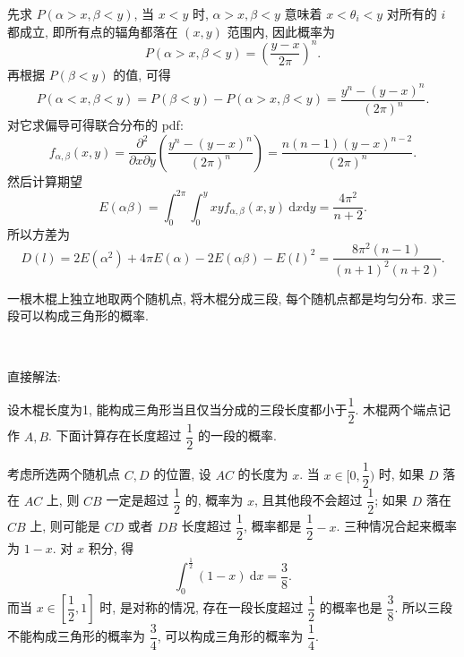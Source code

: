 先求 $P(\alpha > x, \beta < y)$, 当 $x < y$ 时, $\alpha > x, \beta < y$ 意味着 $x < \theta_i < y$ 对所有的 $i$ 都成立, 即所有点的辐角都落在 $(x,y)$ 范围内, 因此概率为 
\[P(\alpha > x, \beta < y) = \left(\frac{y-x}{2\pi}\right)^n .\]
再根据 $P(\beta < y)$ 的值, 可得
\[P(\alpha < x, \beta < y) = P(\beta < y) - P(\alpha > x, \beta < y) = \frac{y^n - (y-x)^n}{(2\pi)^n} . \]
对它求偏导可得联合分布的 pdf:
\[f_{\alpha,\beta}(x,y) = \frac{\partial^2}{\partial x\partial y}\left(\frac{y^n - (y-x)^n}{(2\pi)^n}\right) = \frac{n(n-1)(y-x)^{n-2}}{(2\pi)^n} .\]
然后计算期望
\[E(\alpha\beta) = \int_0^{2\pi}\int_0^y xyf_{\alpha,\beta}(x,y)\ \mathrm{d}x\mathrm{d}y = \frac{4\pi^2}{n+2} .\]
所以方差为
\[D(l) = 2E(\alpha^2) + 4\pi E(\alpha) - 2E(\alpha\beta) - E(l)^2 = \frac{8\pi^2(n-1)}{(n+1)^2(n+2)} .\]

\newpage
一根木棍上独立地取两个随机点, 将木棍分成三段, 每个随机点都是均匀分布. 求三段可以构成三角形的概率.

~

\noindent 直接解法: 

设木棍长度为1, 能构成三角形当且仅当分成的三段长度都小于$\dfrac{1}{2}$. 木棍两个端点记作 $A,B$. 下面计算存在长度超过 $\dfrac{1}{2}$ 的一段的概率.
\begin{figure*}[htbp]
\centering
{}
\end{figure*}

考虑所选两个随机点 $C,D$ 的位置, 设 $AC$ 的长度为 $x$. 当 $x\in[0,\dfrac{1}{2})$ 时, 如果 $D$ 落在 $AC$ 上, 则 $CB$ 一定是超过 $\dfrac{1}{2}$ 的, 概率为 $x$, 且其他段不会超过 $\dfrac{1}{2}$; 如果 $D$ 落在 $CB$ 上, 则可能是 $CD$ 或者 $DB$ 长度超过 $\dfrac{1}{2}$, 概率都是 $\dfrac{1}{2} - x$. 三种情况合起来概率为 $1 - x$. 对 $x$ 积分, 得
\[\int_0^{\frac{1}{2}}{(1-x)}\ \mathrm{d}x = \frac{3}{8}.\]
而当 $x\in[\dfrac{1}{2},1]$ 时, 是对称的情况, 存在一段长度超过 $\dfrac{1}{2}$ 的概率也是 $\dfrac{3}{8}$. 所以三段不能构成三角形的概率为 $\dfrac{3}{4}$, 可以构成三角形的概率为 $\dfrac{1}{4}$.

